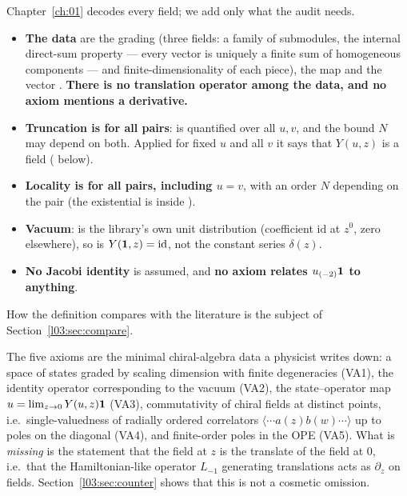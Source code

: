 \begin{dictionary}
Chapter~\ref{ch:01} decodes every field; we add only what the audit needs.
\begin{itemize}
\item \textbf{The data} are the grading (three fields: a family of submodules, the internal
  direct-sum property  --- every vector is uniquely a finite sum of
  homogeneous components --- and finite-dimensionality of each piece), the map  and the
  vector . \textbf{There is no translation operator among the data, and no axiom
  mentions a derivative.}
\item \textbf{Truncation is for all pairs}:  is quantified over all $u,v$,
  and the bound $N$ may depend on both. Applied for fixed $u$ and all $v$ it says that $Y(u,z)$ is
  a field ( below).
\item \textbf{Locality is for all pairs, including $u = v$}, with an order $N$ depending on the
  pair (the existential is inside ).
\item \textbf{Vacuum}:  is the library's own unit distribution (coefficient
  $\mathrm{id}$ at $z^0$, zero elsewhere), so  is $Y(\mathbf{1},z) = \mathrm{id}$,
  not the constant series $\delta(z)$.
\item \textbf{No Jacobi identity} is assumed, and \textbf{no axiom relates $u_{(-2)}\mathbf{1}$ to
  anything}.
\end{itemize}
How the definition compares with the literature is the subject of Section~\ref{l03:sec:compare}.
\end{dictionary}

\begin{physics}
The five axioms are the minimal chiral-algebra data a physicist writes down: a space of states
graded by scaling dimension with finite degeneracies (VA1), the identity operator corresponding to
the vacuum (VA2), the state--operator map $u = \lim_{z\to0}Y(u,z)\mathbf{1}$ (VA3), commutativity of
chiral fields at distinct points, i.e.\ single-valuedness of radially ordered correlators
$\langle\cdots a(z)b(w)\cdots\rangle$ up to poles on the diagonal (VA4), and finite-order poles in
the OPE (VA5). What is \emph{missing} is the statement that the field at $z$ is the translate of
the field at $0$, i.e.\ that the Hamiltonian-like operator $L_{-1}$ generating translations acts as
$\partial_z$ on fields. Section~\ref{l03:sec:counter} shows that this is not a cosmetic omission.
\end{physics}

